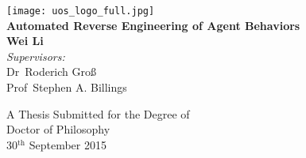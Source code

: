 \begin{titlepage}
\begin{center}


\texttt{[image: uos\_logo\_full.jpg]}~\\[2.0cm]

\textsf{{\Huge \bfseries Automated Reverse Engineering of Agent Behaviors}}~\\[1cm]

\textsf{{\Large \bfseries Wei Li}}~\\[4cm]

{\Large \emph{Supervisors:}~\\
Dr~Roderich Gro\ss~\\
Prof~Stephen A. Billings~\\[1cm]}

{\Large A Thesis Submitted for the Degree of~\\
Doctor of Philosophy}~\\[1cm]

{\Large 30$^\textrm{th}$ September 2015}

\end{center}
\end{titlepage}

